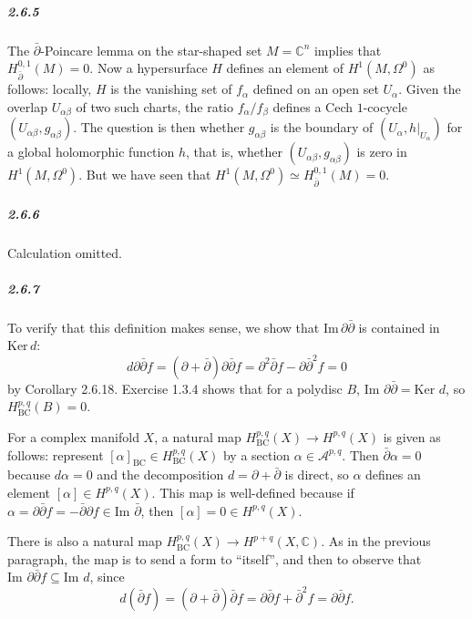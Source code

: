 \documentclass[10pt,letter]{article}
\begin{document}
\subparagraph{2.6.5} The $\bar{\partial}$-Poincare lemma on the star-shaped set $M = \mathbb{C}^n$ implies that $H^{0,1}_{\bar{\partial}}(M) = 0$. Now a hypersurface $H$ defines an element of $H^1(M,\Omega^0)$ as follows: locally, $H$ is the vanishing set of $f_{\alpha}$ defined on an open set $U_{\alpha}$. Given the overlap $U_{\alpha \beta}$ of two such charts, the ratio $f_{\alpha}/f_{\beta}$ defines a Cech $1$-cocycle $(U_{\alpha \beta}, g_{\alpha \beta})$.  The question is then whether $g_{\alpha \beta}$ is the boundary of $(U_{\alpha},h\vert_{U_{\alpha}})$ for a global holomorphic function $h$, that is, whether $(U_{\alpha \beta}, g_{\alpha \beta})$ is zero in $H^1(M,\Omega^0)$. But we have seen that $H^1(M,\Omega^0) \simeq H^{0,1}_{\bar{\partial}}(M) = 0$. 

\subparagraph{2.6.6} Calculation omitted.


\subparagraph{2.6.7} 
To verify that this definition makes sense, we show that $\text{Im} \, \partial \bar{\partial}$ is contained in $\text{Ker} \, d$:
\[ d\partial \bar{\partial}f = (\partial + \bar{\partial})\partial \bar{\partial}f = \partial^2 \bar{\partial} f - \partial \bar{\partial}^2 f = 0 \]
by Corollary 2.6.18. Exercise 1.3.4 shows that for a polydisc $B$, $\text{Im }\partial \bar{\partial} = \text{Ker }d$, so $H^{p,q}_{\text{BC}}(B) = 0$. 

For a complex manifold $X$, a natural map $H^{p,q}_{\text{BC}}(X) \rightarrow H^{p,q}(X)$ is given as follows: represent $[\alpha]_{\text{BC}} \in H^{p,q}_{\text{BC}}(X)$ by a section $\alpha \in \mathcal{A}^{p,q}$. Then $\bar{\partial} \alpha = 0$ because $d \alpha = 0$ and the decomposition $d = \partial + \bar{\partial}$ is direct, so $\alpha$ defines an element $[\alpha] \in H^{p,q}(X)$. This map is well-defined because if $\alpha = \partial \bar{\partial} f = - \bar{\partial} \partial f \in \text{Im }\bar{\partial}$, then $[\alpha] = 0 \in H^{p,q}(X)$. 

There is also a natural map $H^{p,q}_{\text{BC}}(X) \rightarrow H^{p+q}(X, \mathbb{C})$. As in the previous paragraph, the map is to send a form to ``itself'', and then to observe that $\text{Im } \partial \bar{\partial}f \subseteq \text{Im } d$, since  \[ d(\bar{\partial}f) = (\partial + \bar{\partial})\bar{\partial} f = \partial \bar{\partial} f + \bar{\partial}^2f = \partial \bar{\partial} f. \]
\end{document}
